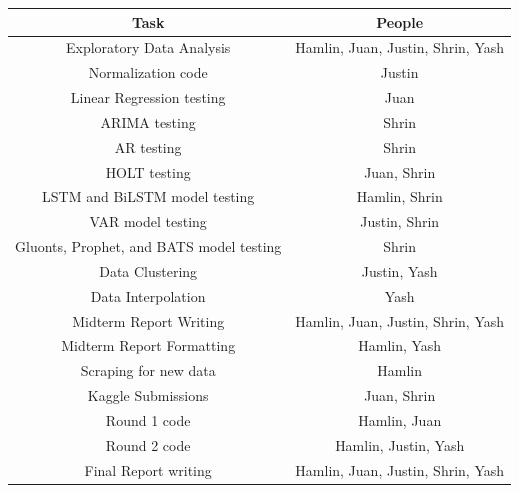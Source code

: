 \documentclass[sigconf,nonacm]{acmart}
\begin{document}
\begin{table}[h!]
    \centering
    \begin{tabular}{|c|c|}
        \hline
         Task & People  \\
         \hline \hline
         Exploratory Data Analysis & Hamlin, Juan, Justin, Shrin, Yash\\
         \hline
         Normalization code & Justin\\
         \hline
         Linear Regression testing & Juan\\
         \hline
         ARIMA testing & Shrin\\
         \hline
         AR testing & Shrin\\
         \hline
         HOLT testing & Juan, Shrin\\
         \hline
         LSTM and BiLSTM model testing & Hamlin, Shrin \\
         \hline
         VAR model testing & Justin, Shrin\\
         \hline
         Gluonts, Prophet, and BATS model testing & Shrin\\
         \hline
         Data Clustering & Justin, Yash\\
         \hline
         Data Interpolation & Yash\\
         \hline
         Midterm Report Writing & Hamlin, Juan, Justin, Shrin, Yash\\
         \hline
         Midterm Report Formatting & Hamlin, Yash\\
         \hline
         Scraping for new data & Hamlin\\
         \hline
         Kaggle Submissions & Juan, Shrin\\
         \hline
         Round 1 code & Hamlin, Juan\\
         \hline
         Round 2 code & Hamlin, Justin, Yash\\
         \hline
         Final Report writing & Hamlin, Juan, Justin, Shrin, Yash\\
         \hline
    \end{tabular}
\end{table}




\end{document}
